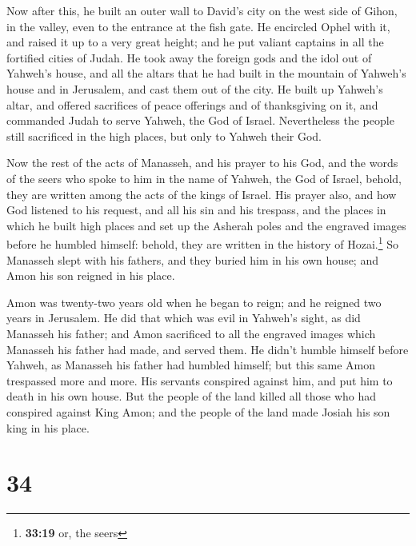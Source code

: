  Now after this, he built an outer wall to David's city
on the west side of Gihon, in the valley, even to the entrance at the
fish gate. He encircled Ophel with it, and raised it up to a very great
height; and he put valiant captains in all the fortified cities of
Judah.  He took away the foreign gods and the idol out of
Yahweh's house, and all the altars that he had built in the mountain of
Yahweh's house and in Jerusalem, and cast them out of the city.
 He built up Yahweh's altar, and offered sacrifices of
peace offerings and of thanksgiving on it, and commanded Judah to serve
Yahweh, the God of Israel.  Nevertheless the people still
sacrificed in the high places, but only to Yahweh their God.

 Now the rest of the acts of Manasseh, and his prayer to
his God, and the words of the seers who spoke to him in the name of
Yahweh, the God of Israel, behold, they are written among the acts of
the kings of Israel.  His prayer also, and how God
listened to his request, and all his sin and his trespass, and the
places in which he built high places and set up the Asherah poles and
the engraved images before he humbled himself: behold, they are written
in the history of Hozai.\footnote{\textbf{33:19} or, the seers}
 So Manasseh slept with his fathers, and they buried him
in his own house; and Amon his son reigned in his place.

 Amon was twenty-two years old when he began to reign;
and he reigned two years in Jerusalem.  He did that which
was evil in Yahweh's sight, as did Manasseh his father; and Amon
sacrificed to all the engraved images which Manasseh his father had
made, and served them.  He didn't humble himself before
Yahweh, as Manasseh his father had humbled himself; but this same Amon
trespassed more and more.  His servants conspired against
him, and put him to death in his own house.  But the
people of the land killed all those who had conspired against King Amon;
and the people of the land made Josiah his son king in his place.

\hypertarget{section-33}{%
\section{34}\label{section-33}}

